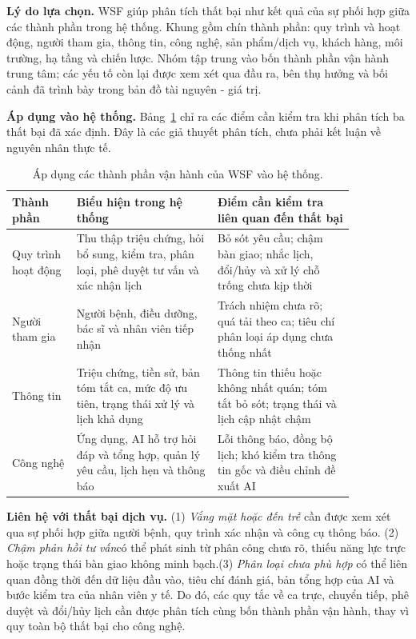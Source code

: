 \noindent\textbf{Lý do lựa chọn.}
WSF giúp phân tích thất bại như kết quả của sự phối hợp giữa các thành phần trong hệ thống. Khung gồm chín thành phần: quy trình và hoạt động, người tham gia, thông tin, công nghệ, sản phẩm/dịch vụ, khách hàng, môi trường, hạ tầng và chiến lược. Nhóm tập trung vào bốn thành phần vận hành trung tâm; các yếu tố còn lại được xem xét qua đầu ra, bên thụ hưởng và bối cảnh đã trình bày trong bản đồ tài nguyên - giá trị.

\noindent\textbf{Áp dụng vào hệ thống.}
Bảng~\ref{tab:work-system} chỉ ra các điểm cần kiểm tra khi phân tích ba thất bại đã xác định. Đây là các giả thuyết phân tích, chưa phải kết luận về nguyên nhân thực tế.

\begin{table}[htbp]
\centering
\caption{Áp dụng các thành phần vận hành của WSF vào hệ thống.}
\label{tab:work-system}
\small
\renewcommand{\arraystretch}{1.12}
\begin{tabular}{
    >{\raggedright\arraybackslash}p{0.16\linewidth}
    >{\raggedright\arraybackslash}p{0.35\linewidth}
    >{\raggedright\arraybackslash}p{0.34\linewidth}
}
\toprule
\textbf{Thành phần} &
\textbf{Biểu hiện trong hệ thống} &
\textbf{Điểm cần kiểm tra liên quan đến thất bại} \\
\midrule

Quy trình hoạt động &
Thu thập triệu chứng, hỏi bổ sung, kiểm tra, phân loại, phê duyệt tư vấn và xác nhận lịch &
Bỏ sót yêu cầu; chậm bàn giao; nhắc lịch, đổi/hủy và xử lý chỗ trống chưa kịp thời \\

Người tham gia &
Người bệnh, điều dưỡng, bác sĩ và nhân viên tiếp nhận &
Trách nhiệm chưa rõ; quá tải theo ca; tiêu chí phân loại áp dụng chưa thống nhất \\

Thông tin &
Triệu chứng, tiền sử, bản tóm tắt ca, mức độ ưu tiên, trạng thái xử lý và lịch khả dụng &
Thông tin thiếu hoặc không nhất quán; tóm tắt bỏ sót; trạng thái và lịch cập nhật chậm \\

Công nghệ & 
Ứng dụng, AI hỗ trợ hỏi đáp và tổng hợp, quản lý yêu cầu, lịch hẹn và thông báo &
 Lỗi thông báo, đồng bộ lịch; khó kiểm tra thông tin gốc và điều chỉnh đề xuất AI \\

\bottomrule
\end{tabular}
\end{table}

\noindent\textbf{Liên hệ với thất bại dịch vụ.} (1) \textit{Vắng mặt hoặc đến trễ} cần được xem xét qua sự phối hợp giữa người bệnh, quy trình xác nhận và công cụ thông báo. (2) \textit{Chậm phản hồi tư vấn}có thể phát sinh từ phân công chưa rõ, thiếu năng lực trực hoặc trạng thái bàn giao không minh bạch.(3) \textit{Phân loại chưa phù hợp} có thể liên quan đồng thời đến dữ liệu đầu vào, tiêu chí đánh giá, bản tổng hợp của AI và bước kiểm tra của nhân viên y tế. Do đó, các quy tắc về ca trực, chuyển tiếp, phê duyệt và đổi/hủy lịch cần được phân tích cùng bốn thành phần vận hành, thay vì quy toàn bộ thất bại cho công nghệ.


